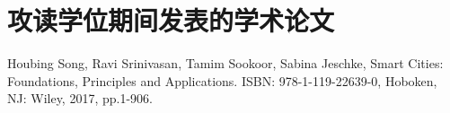 
\chapter{攻读学位期间发表的学术论文}
\begin{thebibliography}{00} %
	Houbing Song, Ravi Srinivasan, Tamim Sookoor, Sabina Jeschke, Smart Cities: Foundations, Principles and Applications. ISBN: 978-1-119-22639-0, Hoboken, NJ: Wiley, 2017, pp.1-906.
\end{thebibliography}